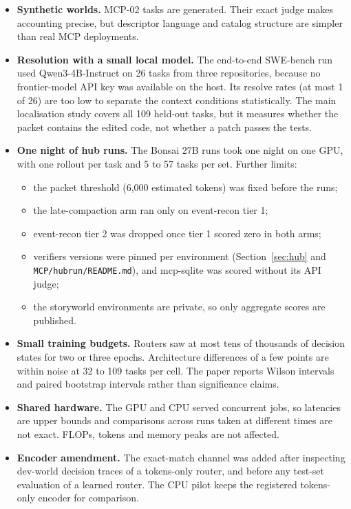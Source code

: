 \begin{itemize}
\item \textbf{Synthetic worlds.} MCP-02 tasks are generated. Their exact judge makes accounting precise, but descriptor
language and catalog structure are simpler than real MCP deployments.
\item \textbf{Resolution with a small local model.} The end-to-end SWE-bench run used Qwen3-4B-Instruct on 26 tasks
from three repositories, because no frontier-model API key was available on the host. Its resolve rates (at most 1
of 26) are too low to separate the context conditions statistically. The main localisation study covers all 109
held-out tasks, but it measures whether the packet contains the edited code, not whether a patch passes the tests.
\item \textbf{One night of hub runs.} The Bonsai 27B runs took one night on one GPU, with one rollout per task and 5 to
57 tasks per set. Further limits:
  \begin{itemize}
  \item the packet threshold (6,000 estimated tokens) was fixed before the runs;
  \item the late-compaction arm ran only on event-recon tier 1;
  \item event-recon tier 2 was dropped once tier 1 scored zero in both arms;
  \item verifiers versions were pinned per environment (Section~\ref{sec:hub} and \texttt{MCP/hubrun/README.md}), and
  mcp-sqlite was scored without its API judge;
  \item the storyworld environments are private, so only aggregate scores are published.
  \end{itemize}
\item \textbf{Small training budgets.} Routers saw at most tens of thousands of decision states for two or three epochs.
Architecture differences of a few points are within noise at 32 to 109 tasks per cell. The paper reports Wilson
intervals and paired bootstrap intervals rather than significance claims.
\item \textbf{Shared hardware.} The GPU and CPU served concurrent jobs, so latencies are upper bounds and comparisons
across runs taken at different times are not exact. FLOPs, tokens and memory peaks are not affected.
\item \textbf{Encoder amendment.} The exact-match channel was added after inspecting dev-world decision traces of a
tokens-only router, and before any test-set evaluation of a learned router. The CPU pilot keeps the registered tokens-only
encoder for comparison.
\end{itemize}

